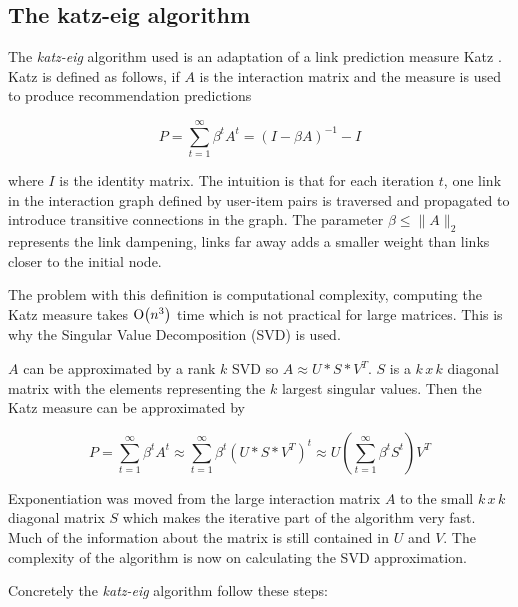 \newpage
\subsection{The katz-eig algorithm}\label{sec:background:theory:katzeig}

The \textit{katz-eig} algorithm used is an adaptation \citep{shin2012multi} of a link prediction measure Katz \citep{katz1953new}. Katz is defined as follows, if $A$ is the interaction matrix and the measure is used to produce recommendation predictions

\begin{equation}
    P = \sum_{t=1}^{\infty} \beta^t A^t = (I - \beta A)^{-1} - I
\end{equation}

where $I$ is the identity matrix. The intuition is that for each iteration $t$, one link in the interaction graph defined by user-item pairs is traversed and propagated to introduce transitive connections in the graph. The parameter $\beta \leq \| A \|_2$ represents the link dampening, links far away adds a smaller weight than links closer to the initial node.

The problem with this definition is computational complexity, computing the Katz measure takes $\operatorname{O}\bigl(n^3\bigr)$ time which is not practical for large matrices. This is why the Singular Value Decomposition (SVD) is used.

$A$ can be approximated by a rank $k$ SVD so $A \approx U * S * V^T$. $S$ is a $k\,x\,k$ diagonal matrix with the elements representing the $k$ largest singular values. Then the Katz measure can be approximated by

\begin{equation}
    P = \sum_{t=1}^{\infty} \beta^t A^t
    \approx \sum_{t=1}^{\infty} \beta^t (U * S * V^T)^t
    \approx U \left( \sum_{t=1}^{\infty} \beta^t S^t \right) V^T
\end{equation}

Exponentiation was moved from the large interaction matrix $A$ to the small $k\,x\,k$ diagonal matrix $S$ which makes the iterative part of the algorithm very fast. Much of the information about the matrix is still contained in $U$ and $V$. The complexity of the algorithm is now on calculating the SVD approximation.


Concretely the \textit{katz-eig} algorithm follow these steps:


